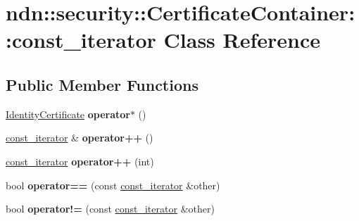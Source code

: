 \hypertarget{classndn_1_1security_1_1CertificateContainer_1_1const__iterator}{}\section{ndn\+:\+:security\+:\+:Certificate\+Container\+:\+:const\+\_\+iterator Class Reference}
\label{classndn_1_1security_1_1CertificateContainer_1_1const__iterator}
\subsection*{Public Member Functions}
\begin{DoxyCompactItemize}
\item 
\hyperlink{classndn_1_1IdentityCertificate}{Identity\+Certificate} {\bfseries operator$\ast$} ()\hypertarget{classndn_1_1security_1_1CertificateContainer_1_1const__iterator_a79d590547e6dc95504f472e283a17f57}{}\label{classndn_1_1security_1_1CertificateContainer_1_1const__iterator_a79d590547e6dc95504f472e283a17f57}

\item 
\hyperlink{classndn_1_1security_1_1CertificateContainer_1_1const__iterator}{const\+\_\+iterator} \& {\bfseries operator++} ()\hypertarget{classndn_1_1security_1_1CertificateContainer_1_1const__iterator_aa6579e0c3d8860cfd2e3a84496f3df0b}{}\label{classndn_1_1security_1_1CertificateContainer_1_1const__iterator_aa6579e0c3d8860cfd2e3a84496f3df0b}

\item 
\hyperlink{classndn_1_1security_1_1CertificateContainer_1_1const__iterator}{const\+\_\+iterator} {\bfseries operator++} (int)\hypertarget{classndn_1_1security_1_1CertificateContainer_1_1const__iterator_a59f8355099ef618527552084ac0393c4}{}\label{classndn_1_1security_1_1CertificateContainer_1_1const__iterator_a59f8355099ef618527552084ac0393c4}

\item 
bool {\bfseries operator==} (const \hyperlink{classndn_1_1security_1_1CertificateContainer_1_1const__iterator}{const\+\_\+iterator} \&other)\hypertarget{classndn_1_1security_1_1CertificateContainer_1_1const__iterator_afa104f73f8f2fdd66aef36d79ea7c357}{}\label{classndn_1_1security_1_1CertificateContainer_1_1const__iterator_afa104f73f8f2fdd66aef36d79ea7c357}

\item 
bool {\bfseries operator!=} (const \hyperlink{classndn_1_1security_1_1CertificateContainer_1_1const__iterator}{const\+\_\+iterator} \&other)\hypertarget{classndn_1_1security_1_1CertificateContainer_1_1const__iterator_a872dc57261f8cbc19654d5d06d6d7784}{}\label{classndn_1_1security_1_1CertificateContainer_1_1const__iterator_a872dc57261f8cbc19654d5d06d6d7784}

\end{DoxyCompactItemize}
